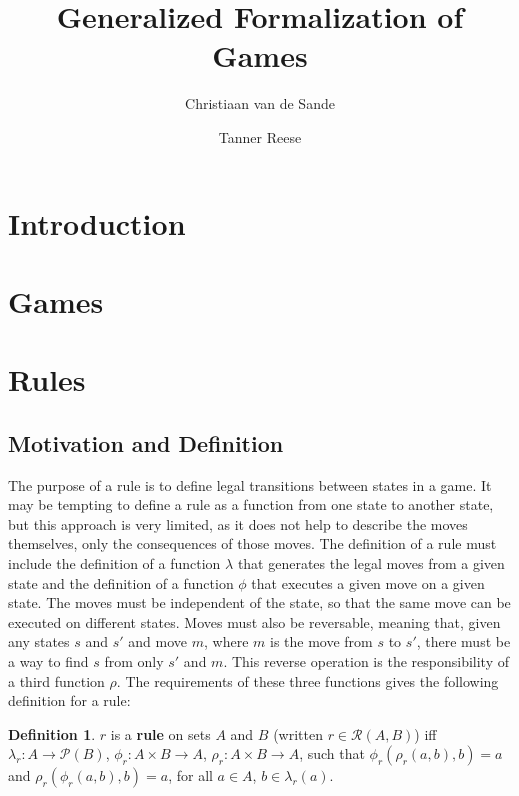 \documentclass{article}
\title{Generalized Formalization of Games}
\author{Christiaan van de Sande \and Tanner Reese}
\theoremstyle{definition}
\newtheorem{definition}{Definition}[subsection]
\theoremstyle{plain}
\def\rule{\mathcal{R}}
\begin{document}
\maketitle

\section{Introduction}
 
\section{Games}

\section{Rules}

\subsection{Motivation and Definition} %

The purpose of a rule is to define legal transitions between states in a game.
It may be tempting to define a rule as a function from one state to another state, but this approach is very limited,
as it does not help to describe the moves themselves, only the consequences of those moves.
The definition of a rule must include
the definition of a function $ \lambda $ that generates the legal moves from a given state
and the definition of a function $ \phi $ that executes a given move on a given state.
The moves must be independent of the state, so that the same move can be executed on different states.
Moves must also be reversable,
meaning that, given any states $ s $ and $ s' $ and move $ m $,
where $ m $ is the move from $ s $ to $ s' $,
there must be a way to find $ s $ from only $ s' $ and $ m $.
This reverse operation is the responsibility of a third function $ \rho $.
The requirements of these three functions gives the following definition for a rule:

 \begin{definition}
  $ r $ is a \textbf{rule} on sets $ A $ and $ B $ (written  $ r \in \rule (A, B) $) iff
  $ \lambda_r : A          \rightarrow \mathcal{P} (B) $,
  $    \phi_r : A \times B \rightarrow A $,
  $    \rho_r : A \times B \rightarrow A $,
  such that $ \phi_r (\rho_r (a, b), b) = a $
  and $ \rho_r (\phi_r (a, b), b) = a $,
  for all $ a \in A $, $ b \in \lambda_r (a) $.
\end{definition}
\end{document}
